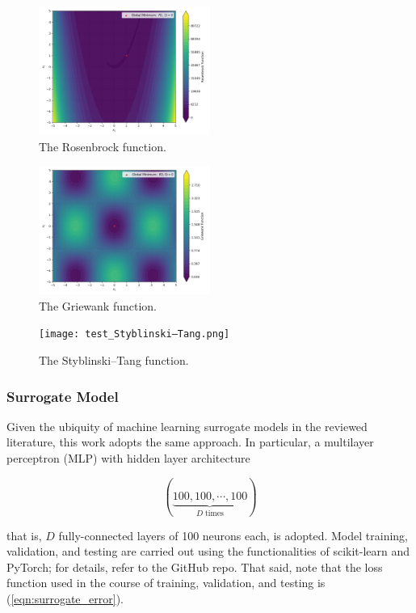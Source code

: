 \documentclass[conference]{IEEEtran}
\begin{document}
\begin{figure}[htbp]
	\centerline{\includegraphics[width=0.5\textwidth]{test_Rosenbrock.png}}
	\caption{The Rosenbrock function.}
	\label{fig:Rosenbrock}
\end{figure}

\begin{figure}[htbp]
	\centerline{\includegraphics[width=0.5\textwidth]{test_Griewank.png}}
	\caption{The Griewank function.}
	\label{fig:Griewank}
\end{figure}

\begin{figure}[htbp]
	\centerline{\texttt{[image: test\_Styblinski–Tang.png]}}
	\caption{The Styblinski–Tang function.}
	\label{fig:Styblinski–Tang}
\end{figure}

\subsubsection{Surrogate Model}

Given the ubiquity of machine learning surrogate models in the reviewed literature, this work adopts the same approach. In particular, a multilayer perceptron (MLP) with hidden layer architecture

$$ \left(\underbrace{100, 100, \cdots, 100}_{D\;\textrm{times}}\right) $$

\noindent that is, $D$ fully-connected layers of 100 neurons each, is adopted. Model training, validation, and testing are carried out using the functionalities of scikit-learn and PyTorch; for details, refer to the GitHub repo. That said, note that the loss function used in the course of training, validation, and testing is (\ref{eqn:surrogate_error}).
\end{document}
